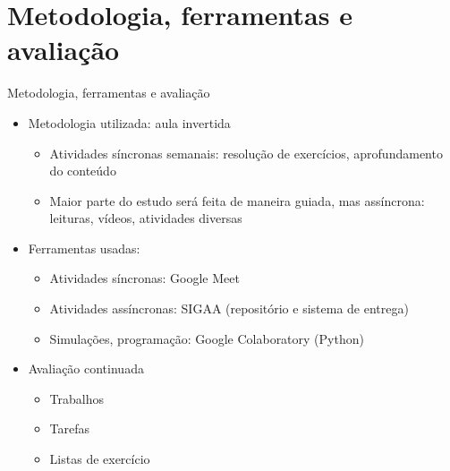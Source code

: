     \section[ slide = true]{Metodologia, ferramentas e avaliação}
      \begin{slide}[toc=]{Metodologia, ferramentas e avaliação}
         \begin{itemize}
	    \item Metodologia utilizada: aula invertida  
		    \begin{itemize}
			    \item Atividades síncronas semanais: resolução de exercícios, aprofundamento do conteúdo
			    \item Maior parte do estudo será feita de maneira guiada, mas assíncrona: leituras, vídeos, atividades diversas
		    \end{itemize}
	    \item Ferramentas usadas:
		    \begin{itemize}
			    \item Atividades síncronas: Google Meet %
			    \item Atividades assíncronas: SIGAA (repositório e sistema de entrega)
			    \item Simulações, programação: Google Colaboratory (Python)
		    \end{itemize}
            \item Avaliação continuada
            \begin{itemize}
               \item Trabalhos 
               \item Tarefas 
	       \item Listas de exercício
	    \end{itemize}
	 \end{itemize}
	 \end{slide}	  


